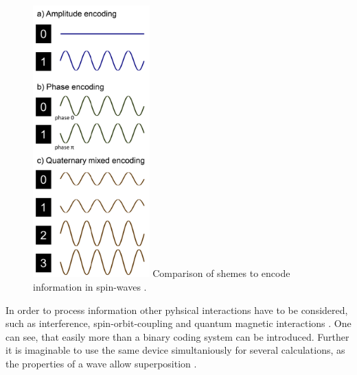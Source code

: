 \begin{figure}
    \centering
  \captionsetup{width=0.7\linewidth}
  \includegraphics[width=0.4\textwidth]{graphics/spin-code.png}
  {Comparison of shemes to encode information in spin-waves \cite{computing}.}
  \label{fig:spin-coding}
\end{figure}

In order to process information other pyhsical interactions have to be considered, such as interference, spin-orbit-coupling and quantum magnetic interactions \cite{perovskite}.
One can see, that easily more than a binary coding system can be introduced. 
Further it is imaginable to use the same device simultaniously for several calculations, as the properties of a wave allow superposition \cite{computing}.

